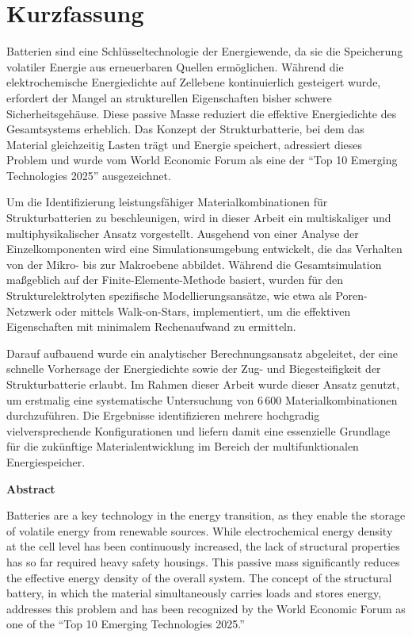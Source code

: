 \hypersetup{pageanchor=false}
\chapter*{Kurzfassung}
\thispagestyle{empty}

Batterien sind eine Schlüsseltechnologie der Energiewende, da sie die Speicherung volatiler Energie aus erneuerbaren Quellen ermöglichen. Während die elektrochemische Energiedichte auf Zellebene kontinuierlich gesteigert wurde, erfordert der Mangel an strukturellen Eigenschaften bisher schwere Sicherheitsgehäuse. Diese passive Masse reduziert die effektive Energiedichte des Gesamtsystems erheblich. Das Konzept der Strukturbatterie, bei dem das Material gleichzeitig Lasten trägt und Energie speichert, adressiert dieses Problem und wurde vom World Economic Forum als eine der "`Top 10 Emerging Technologies 2025"' ausgezeichnet.

Um die Identifizierung leistungsfähiger Materialkombinationen für Strukturbatterien zu beschleunigen, wird in dieser Arbeit ein multiskaliger und multiphysikalischer Ansatz vorgestellt. Ausgehend von einer Analyse der Einzelkomponenten wird eine Simulationsumgebung entwickelt, die das Verhalten von der Mikro- bis zur Makroebene abbildet. Während die Gesamtsimulation maßgeblich auf der Finite-Elemente-Methode basiert, wurden für den Strukturelektrolyten spezifische Modellierungsansätze, wie etwa als Poren-Netzwerk oder mittels Walk-on-Stars, implementiert, um die effektiven Eigenschaften mit minimalem Rechenaufwand zu ermitteln.

Darauf aufbauend wurde ein analytischer Berechnungsansatz abgeleitet, der eine schnelle Vorhersage der Energiedichte sowie der Zug- und Biegesteifigkeit der Strukturbatterie erlaubt. Im Rahmen dieser Arbeit wurde dieser Ansatz genutzt, um erstmalig eine systematische Untersuchung von 6\,600 Materialkombinationen durchzuführen. Die Ergebnisse identifizieren mehrere hochgradig vielversprechende Konfigurationen und liefern damit eine essenzielle Grundlage für die zukünftige Materialentwicklung im Bereich der multifunktionalen Energiespeicher.

\pagebreak
\thispagestyle{empty}
{\bfseries \LARGE Abstract}
\vspace{1cm}

Batteries are a key technology in the energy transition, as they enable the storage of volatile energy from renewable sources. While electrochemical energy density at the cell level has been continuously increased, the lack of structural properties has so far required heavy safety housings. This passive mass significantly reduces the effective energy density of the overall system. The concept of the structural battery, in which the material simultaneously carries loads and stores energy, addresses this problem and has been recognized by the World Economic Forum as one of the “Top 10 Emerging Technologies 2025.”

